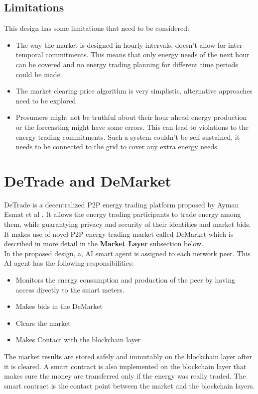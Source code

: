 \subsection{Limitations}
This design has some limitations that need to be considered:
\begin{itemize}
    \item The way the market is designed in hourly intervals, doesn't allow for inter-temporal commitments. This means that only energy needs of the next hour can be covered
          and no energy trading planning for different time periods could be made.
    \item The market clearing price algorithm is very simplistic, alternative approaches need to be explored
    \item Prosumers might not be truthful about their hour ahead energy production or the forecasting might have some errors. This can lead to violations to the energy trading
          commitments. Such a system couldn't be self sustained, it needs to be connected to the grid to cover any extra energy needs.
\end{itemize}

\section{DeTrade and DeMarket}
\label{sec:dtr}
DeTrade is a decentralized P2P energy trading platform proposed by Ayman Esmat et al \cite{DeTrade}. It allows the energy trading participants to trade energy among them, while guarantying privacy
and security of their identities and market bids. It makes use of novel P2P energy trading market called DeMarket which is described in more detail in the \textbf{Market Layer}
subsection below.\\
In the proposed design, a, AI smart agent is assigned to each network peer. This AI agent has the following responsibilities:
\begin{itemize}
    \item Monitors the energy consumption and production of the peer by having access directly to the smart meters.
    \item Makes bids in the DeMarket
    \item Clears the market
    \item Makes Contact with the blockchain layer
\end{itemize}
The market results are stored safely and immutably on the blockchain layer after it is cleared. A smart contract is also implemented on the blockchain layer that makes sure the money
are transferred only if the energy was really traded. The smart contract is the contact point between the market and the blockchain layers.
\cite{DeTrade}

